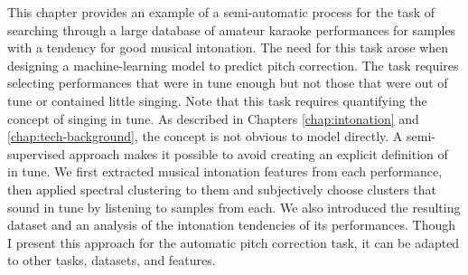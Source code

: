 This chapter provides an example of a semi-automatic process for the task of searching through a large database of amateur karaoke performances for samples with a tendency for good musical intonation. The need for this task arose when designing a machine-learning model to predict pitch correction. The task requires selecting performances that were in tune enough but not those that were out of tune or contained little singing. Note that this task requires quantifying the concept of singing in tune. As described in Chapters \ref{chap:intonation} and \ref{chap:tech-background}, the concept is not obvious to model directly. A semi-supervised approach makes it possible to avoid creating an explicit definition of in tune. We first extracted musical intonation features from each performance, then applied spectral clustering to them and subjectively choose clusters that sound in tune by listening to samples from each. We also introduced the resulting dataset and an analysis of the intonation tendencies of its performances. Though I present this approach for the automatic pitch correction task, it can be adapted to other tasks, datasets, and features.

